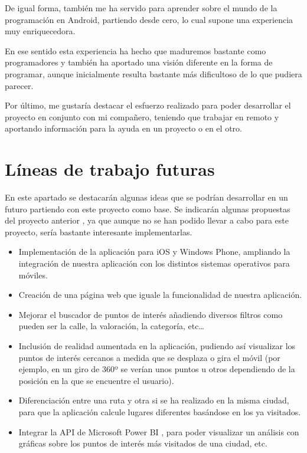 De igual forma, también me ha servido para aprender sobre el mundo de la programación en Android, partiendo desde cero, lo cual supone una experiencia muy enriquecedora.

En ese sentido esta experiencia ha hecho que maduremos bastante como programadores y también ha aportado una visión diferente en la forma de programar, aunque inicialmente resulta bastante más dificultoso de lo que pudiera parecer.

Por último, me gustaría destacar el esfuerzo realizado para poder desarrollar el proyecto en conjunto con mi compañero, teniendo que trabajar en remoto y aportando información para la ayuda en un proyecto o en el otro.

\section{Líneas de trabajo futuras}

En este apartado se destacarán algunas ideas que se podrían desarrollar en un futuro partiendo con este proyecto como base. Se indicarán algunas propuestas del proyecto anterior \cite{tfm1}, ya que aunque no se han podido llevar a cabo para este proyecto, sería bastante interesante implementarlas.

\begin{itemize}
\item Implementación de la aplicación para iOS y Windows Phone, ampliando la integración de nuestra aplicación con los distintos sistemas operativos para móviles.
\item Creación de una página web que iguale la funcionalidad de nuestra aplicación.
\item Mejorar el buscador de puntos de interés añadiendo diversos filtros como pueden ser la calle, la valoración, la categoría, etc…
\item Inclusión de realidad aumentada en la aplicación, pudiendo así visualizar los puntos de interés cercanos a medida que se desplaza o gira el móvil (por ejemplo, en un giro de 360º se verían unos puntos u otros dependiendo de la posición en la que se encuentre el usuario).
\item Diferenciación entre una ruta y otra si se ha realizado en la misma ciudad, para que la aplicación calcule lugares diferentes basándose en los ya visitados.
\item Integrar la API de Microsoft Power BI \cite{pbi}, para poder visualizar un análisis con gráficas sobre los puntos de interés más visitados de una ciudad, etc.
\end{itemize}
